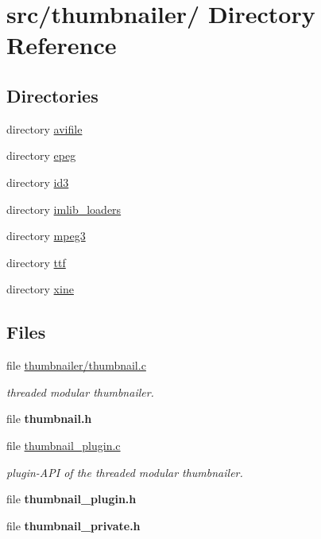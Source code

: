 \hypertarget{dir_000008}{
\section{src/thumbnailer/ Directory Reference}
\label{dir_000008}
}
\subsection*{Directories}
\begin{CompactItemize}
\item 
directory \hyperlink{dir_000009}{avifile}
\item 
directory \hyperlink{dir_000018}{epeg}
\item 
directory \hyperlink{dir_000027}{id3}
\item 
directory \hyperlink{dir_000029}{imlib\_\-loaders}
\item 
directory \hyperlink{dir_000033}{mpeg3}
\item 
directory \hyperlink{dir_000048}{ttf}
\item 
directory \hyperlink{dir_000017}{xine}
\end{CompactItemize}
\subsection*{Files}
\begin{CompactItemize}
\item 
file \hyperlink{thumbnailer_2thumbnail_8c}{thumbnailer/thumbnail.c}
\begin{CompactList}\small\item\em threaded modular thumbnailer. \item\end{CompactList}

\item 
file {\bf thumbnail.h}
\item 
file \hyperlink{thumbnail__plugin_8c}{thumbnail\_\-plugin.c}
\begin{CompactList}\small\item\em plugin-API of the threaded modular thumbnailer. \item\end{CompactList}

\item 
file {\bf thumbnail\_\-plugin.h}
\item 
file {\bf thumbnail\_\-private.h}
\end{CompactItemize}

